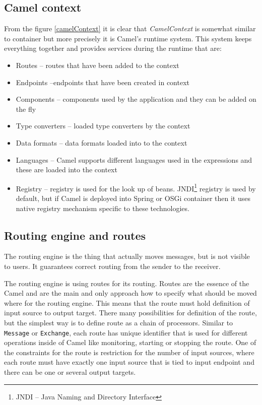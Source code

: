 \documentclass[12pt,final,oneside]{fithesis2}
\begin{document}
\subsection*{Camel context}
From the figure \ref{camelContext} it is clear that \textit{CamelContext} is somewhat similar to container but more precisely it is Camel's runtime system. This system keeps everything together and provides services during the runtime that are:
\begin{itemize}
\item
Routes -- routes that have been added to the context

\item
Endpoints --endpoints that have been created in context

\item
Components -- components used by the application and they can be added on the fly

\item
Type converters -- loaded type converters by the context

\item
Data formats -- data formats loaded into to the context

\item
Languages -- Camel supports different languages used in the expressions and these are loaded into the context

\item
Registry -- registry is used for the look up of beans. JNDI\footnote{JNDI -- Java Naming and Directory Interface} registry is used by default, but if Camel is deployed into Spring or OSGi container then it uses native registry mechanism specific to these technologies.

\end{itemize}

\subsection*{Routing engine and routes}
The routing engine is the thing that actually moves messages, but is not visible to users. It guarantees correct routing from the sender to the receiver.

The routing engine is using routes for its routing. Routes are the essence of the Camel and are the main and only approach how to specify what should be moved where for the routing engine. This means that the route must hold definition of input source to output target. There many possibilities for definition of the route, but the simplest way is to define route as a chain of processors\cite{camel-in-action}. Similar to \texttt{Message} or \texttt{Exchange}, each route has unique identifier that is used for different operations inside of Camel like monitoring, starting or stopping the route. One of the constraints for the route is restriction for the number of input sources, where each route must have exactly one input source that is tied to input endpoint and there can be one or several output targets.
\end{document}
